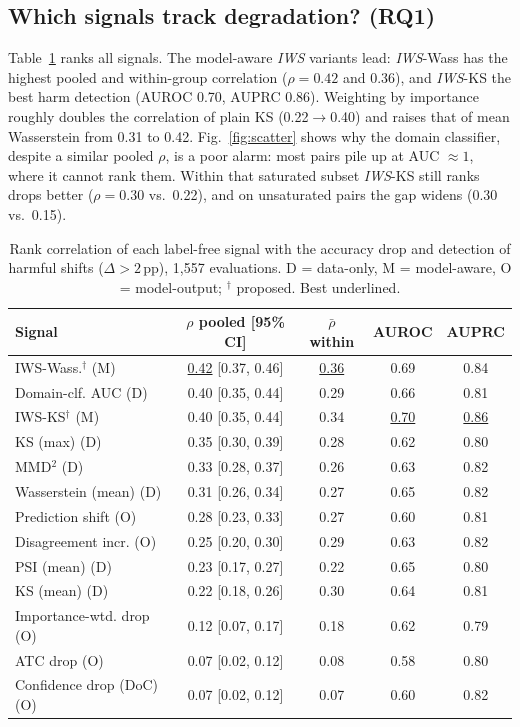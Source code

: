 \documentclass[conference]{IEEEtran}
\theoremstyle{plainhead}
\newcommand{\iws}{\textit{IWS}}
\newcommand{\pp}{\,pp\xspace}
\begin{document}
\subsection{Which signals track degradation? (RQ1)}
Table~\ref{tab:corr} ranks all signals. The model-aware \iws{} variants lead: \iws{}-Wass has the highest pooled and within-group correlation ($\rho=0.42$ and $0.36$), and \iws{}-KS the best harm detection (AUROC 0.70, AUPRC 0.86). Weighting by importance roughly doubles the correlation of plain KS (0.22$\to$0.40) and raises that of mean Wasserstein from 0.31 to 0.42. Fig.~\ref{fig:scatter} shows why the domain classifier, despite a similar pooled $\rho$, is a poor alarm: most pairs pile up at AUC $\approx1$, where it cannot rank them. Within that saturated subset \iws{}-KS still ranks drops better ($\rho=0.30$ vs.\ 0.22), and on unsaturated pairs the gap widens (0.30 vs.\ 0.15).

\begin{table}[t]
\centering
\caption{Rank correlation of each label-free signal with the accuracy drop and detection of harmful shifts ($\Delta>2$\pp), 1{,}557 evaluations. D = data-only, M = model-aware, O = model-output; $^\dagger$ proposed. Best underlined.}
\label{tab:corr}
\footnotesize
\setlength{\tabcolsep}{3pt}
\begin{tabular}{lcccc}
\toprule
Signal & $\rho$ pooled [95\% CI] & $\bar\rho$ within & AUROC & AUPRC \\
\midrule
IWS-Wass.$^\dagger$ (M) & \underline{0.42} [0.37, 0.46] & \underline{0.36} & 0.69 & 0.84 \\
Domain-clf. AUC (D) & 0.40 [0.35, 0.44] & 0.29 & 0.66 & 0.81 \\
IWS-KS$^\dagger$ (M) & 0.40 [0.35, 0.44] & 0.34 & \underline{0.70} & \underline{0.86} \\
KS (max) (D) & 0.35 [0.30, 0.39] & 0.28 & 0.62 & 0.80 \\
MMD$^2$ (D) & 0.33 [0.28, 0.37] & 0.26 & 0.63 & 0.82 \\
Wasserstein (mean) (D) & 0.31 [0.26, 0.34] & 0.27 & 0.65 & 0.82 \\
Prediction shift (O) & 0.28 [0.23, 0.33] & 0.27 & 0.60 & 0.81 \\
Disagreement incr. (O) & 0.25 [0.20, 0.30] & 0.29 & 0.63 & 0.82 \\
PSI (mean) (D) & 0.23 [0.17, 0.27] & 0.22 & 0.65 & 0.80 \\
KS (mean) (D) & 0.22 [0.18, 0.26] & 0.30 & 0.64 & 0.81 \\
Importance-wtd. drop (O) & 0.12 [0.07, 0.17] & 0.18 & 0.62 & 0.79 \\
ATC drop (O) & 0.07 [0.02, 0.12] & 0.08 & 0.58 & 0.80 \\
Confidence drop (DoC) (O) & 0.07 [0.02, 0.12] & 0.07 & 0.60 & 0.82 \\
\bottomrule
\end{tabular}
\end{table}
\end{document}

